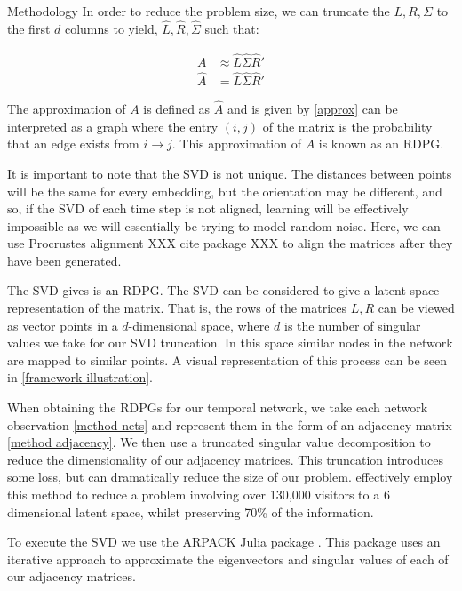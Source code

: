 \documentclass[12pt]{amsart}
\begin{document}
\begin{section}{Methodology}
            In order to reduce the problem size, we can truncate the $L,R,\Sigma$ to the first $d$ columns to yield, $\hat L, \hat R, \hat \Sigma$ such that:

            \begin{align}
                A &\approx \hat L \hat \Sigma \hat R' \\
                \hat A &= \hat L \hat \Sigma \hat R'
                \label{approx}
            \end{align}

            The approximation of $A$ is defined as $\hat A$ and is given by \autoref{approx} can be interpreted as a graph where the entry $(i,j)$ of the matrix is the probability that an edge exists from $i \rightarrow j$. This approximation of $A$ is known as an RDPG.

            It is important to note that the SVD is not unique. The distances between points will be the same for every embedding, but the orientation may be different, and so, if the SVD of each time step is not aligned, learning will be effectively impossible as we will essentially be trying to model random noise. Here, we can use Procrustes alignment XXX cite package XXX to align the matrices after they have been generated.


            The SVD gives is an RDPG\cite{athreya2017statistical}. The SVD can be considered to give a latent space representation of the matrix\cite{hoff2002latent}. That is, the rows of the matrices $L,R$ can be viewed as vector points in a $d$-dimensional space, where $d$ is the number of singular values we take for our SVD truncation. In this space similar nodes in the network are mapped to similar points. A visual representation of this process can be seen in \autoref{framework illustration}. 
            
            When obtaining the RDPGs for our temporal network, we take each network observation \autoref{method nets} and represent them in the form of an adjacency matrix \autoref{method adjacency}. We then use a truncated singular value decomposition to reduce the dimensionality of our adjacency matrices\cite{golub1971singular}. This truncation introduces some loss, but can dramatically reduce the size of our problem. \cite{Runghen2021} effectively employ this method to reduce a problem involving over 130,000 visitors to a 6 dimensional latent space, whilst preserving 70\% of the information.

            To execute the SVD we use the ARPACK Julia package \cite{lehoucq1998arpack}. This package uses an iterative approach to approximate the eigenvectors and singular values of each of our adjacency matrices\cite{lehoucq1996deflation}.    


\end{section}
\end{document}
